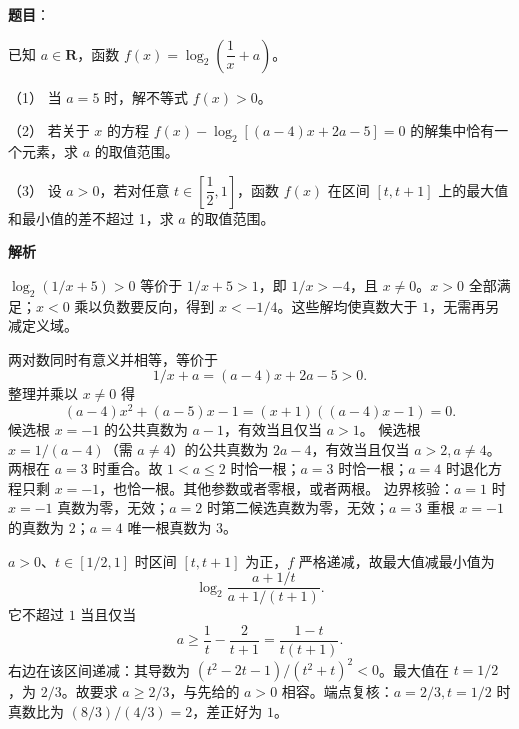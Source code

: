 \begin{answer}

\textbf{题目}：

已知 \(a\in\mathbf{R}\)，函数 \(f(x)=\log_2\left(\dfrac{1}{x}+a\right)\)。

（1） 当 \(a=5\) 时，解不等式 \(f(x)>0\)。

（2） 若关于 \(x\) 的方程 \(f(x)-\log_2[(a-4)x+2a-5]=0\) 的解集中恰有一个元素，求 \(a\) 的取值范围。

（3） 设 \(a>0\)，若对任意 \(t\in\left[\dfrac{1}{2},1\right]\)，函数 \(f(x)\) 在区间 \([t,t+1]\) 上的最大值和最小值的差不超过 1，求 \(a\) 的取值范围。

\textbf{解析}


\(\log_2(1/x+5)>0\) 等价于 \(1/x+5>1\)，即 \(1/x>-4\)，且 \(x\ne0\)。\(x>0\) 全部满足；\(x<0\) 乘以负数要反向，得到 \(x<-1/4\)。这些解均使真数大于 \(1\)，无需再另减定义域。

两对数同时有意义并相等，等价于
\nopagebreak[4]
\[
1/x+a=(a-4)x+2a-5>0.
\]
整理并乘以 \(x\ne0\) 得
\nopagebreak[4]
\[
(a-4)x^2+(a-5)x-1=(x+1)((a-4)x-1)=0.
\]
候选根 \(x=-1\) 的公共真数为 \(a-1\)，有效当且仅当 \(a>1\)。
候选根 \(x=1/(a-4)\)（需 \(a\ne4\)）的公共真数为 \(2a-4\)，有效当且仅当 \(a>2,a\ne4\)。
两根在 \(a=3\) 时重合。故 \(1<a\le2\) 时恰一根；\(a=3\) 时恰一根；\(a=4\) 时退化方程只剩 \(x=-1\)，也恰一根。其他参数或者零根，或者两根。
边界核验：\(a=1\) 时 \(x=-1\) 真数为零，无效；\(a=2\) 时第二候选真数为零，无效；\(a=3\) 重根 \(x=-1\) 的真数为 \(2\)；\(a=4\) 唯一根真数为 \(3\)。

\(a>0\)、\(t\in[1/2,1]\) 时区间 \([t,t+1]\) 为正，\(f\) 严格递减，故最大值减最小值为
\nopagebreak[4]
\[
\log_2\frac{a+1/t}{a+1/(t+1)}.
\]
它不超过 \(1\) 当且仅当
\nopagebreak[4]
\[
a\ge\frac1t-\frac2{t+1}=\frac{1-t}{t(t+1)}.
\]
右边在该区间递减：其导数为 \((t^2-2t-1)/(t^2+t)^2<0\)。最大值在 \(t=1/2\)，为 \(2/3\)。故要求 \(a\ge2/3\)，与先给的 \(a>0\) 相容。端点复核：\(a=2/3,t=1/2\) 时真数比为 \((8/3)/(4/3)=2\)，差正好为 \(1\)。


\gkanswer{答案（2）：\((1,2]\cup\{3,4\}\)。}

\gkanswer{答案（3）：\([\dfrac23,+\infty)\)。}

\end{answer}
